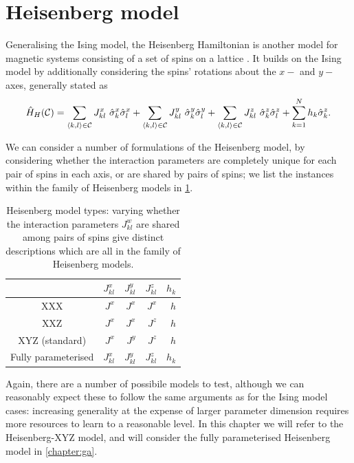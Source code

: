 \section{Heisenberg model}\label{sec:heisenberg}
Generalising the Ising model, the Heisenberg Hamiltonian is another model for magnetic systems consisting of a set of 
    spins on a lattice \cite{greiner2012thermodynamics}. 
It builds on the Ising model by additionally considering the spins' rotations about the $x-$ and $y-$ axes, generally stated as 
\begin{equation}
    \label{eqn:heisenberg_model_general}
    \hat{H}_H({ \mathcal{C}}) = 
    \sum\limits_{{ \langle k, l \rangle } \in { \mathcal{C}}} J^x_{kl} \  \hat{\sigma}^x_k \hat{\sigma}^x_l
    + \sum\limits_{{ \langle k, l \rangle } \in { \mathcal{C}}} J^y_{kl} \ \hat{\sigma}^y_k \hat{\sigma}^y_l
    + \sum\limits_{{ \langle k, l \rangle } \in { \mathcal{C}}} J^z_{kl} \ \hat{\sigma}^z_k \hat{\sigma}^z_l
    + \sum\limits_{k=1}^{N} h_k \hat{\sigma}^z_k.
\end{equation}

We can consider a number of formulations of the Heisenberg model, by considering whether the interaction
    parameters are completely unique for each pair of spins in each axis, 
    or  are shared by pairs of spins;
    we list the instances within the family of Heisenberg models in \cref{table:heisenberg_models}. 
\begin{table}
    \begin{center}
        \begin{tabular}{crrrr}
             & $J^x_{kl}$ & $J^y_{kl}$ & $J^z_{kl}$ & $h_k$ \\
            \hline
            XXX & $J^x$ & $J^x$ & $J^x$ & $h$ \\
            XXZ & $J^x$ & $J^x$ & $J^z$ & $h$ \\
            XYZ (standard) & $J^x$ & $J^y$ & $J^z$ & $h$ \\
            Fully parameterised & $J^x_{kl}$ & $J^y_{kl}$ & $J^z_{kl}$ & $h_k$ \\
            
        \end{tabular}
    \end{center}
    \caption[Types of Heisenberg model]{
        Heisenberg model types: varying whether the interaction parameters $J^{w}_{kl}$ are shared among pairs of spins
        give distinct descriptions which are all in the family of Heisenberg models. 
    }
    \label{table:heisenberg_models}
\end{table}

Again, there are a number of possibile models to test, 
    although we can reasonably expect these to follow the same arguments as for the Ising model cases: 
    increasing generality at the expense of larger parameter dimension requires more resources to learn to a reasonable level. 
In this chapter we will refer to the Heisenberg-XYZ model,
    and will consider the fully parameterised Heisenberg model in \cref{chapter:ga}.

